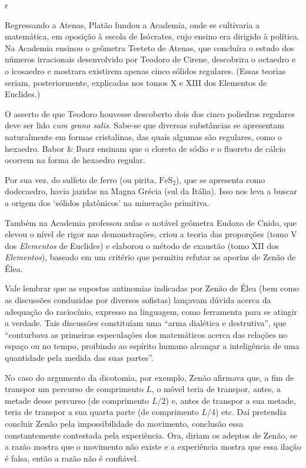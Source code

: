 r\documentclass{hipatia}
\begin{document}
Regressando a Atenas, Platão fundou a Academia, onde se cultivaria a matemática, em oposição à escola de Isócrates, cujo ensino era dirigido à política. Na Academia ensinou o geômetra Teeteto de Atenas, que concluíra o estudo dos números irracionais desenvolvido por Teodoro de Cirene, descobrira o octaedro e o icosaedro e mostrara existirem apenas cinco sólidos regulares. (Essas teorias seriam, posteriormente, explicadas nos tomos X e XIII dos Elementos de Euclides.)  \cite[ p. 64]{aaboe1984}\cite[p. 172, 188]{mosterin1984}\cite[p. 147]{russell1945}

O asserto de que Teodoro houvesse descoberto dois dos cinco poliedros regulares deve ser lido \emph{cum grano salis}. Sabe-se que diversas substâncias se apresentam naturalmente em formas cristalinas, das quais algumas são regulares, como o hexaedro. Babor \& Ibarz ensinam que o cloreto de sódio e o fluoreto de cálcio ocorrem na forma de hexaedro regular. \cite[p. 84]{babor1960}

Por sua vez, do sulfeto de ferro (ou pirita, $\mathrm{FeS}_2$), que se apresenta como dodecaedro, havia jazidas na Magna Grécia (sul da Itália).  \cite[p. 41--42]{struik1987}
Isso nos leva a buscar a origem dos ‘sólidos platônicos’ na mineração primitiva. 

Também na Academia professou aulas o notável geômetra Eudoxo de Cnido, que elevou o nível de rigor nas demonstrações, criou a teoria das proporções (tomo V dos \emph{Elementos} de Euclides) e elaborou o método de exaustão (tomo XII dos \emph{Elementos}), baseado em um critério que permitiu refutar as aporias de Zenão de Élea.   \cite[p. 64]{aaboe1984}\cite[p. 175]{mosterin1984}

Vale lembrar que as supostas antinomias indicadas por Zenão de Élea  (bem como as discussões conduzidas por diversos sofistas)  lançavam dúvida acerca da adequação do raciocínio, expresso na linguagem, como ferramenta para se atingir a verdade. Tais discussões constituíam uma ``arma dialética e destrutiva'', que ``conturbava as primeiras especulações dos matemáticos acerca das relações no espaço ou no tempo, proibindo ao espírito humano alcançar a inteligência de uma quantidade pela medida das suas partes''. \cite[p. 154]{brunschvicg1972} 

No caso do argumento da dicotomia, por exemplo, Zenão afirmava que, a fim de transpor um percurso de comprimento $L$, o móvel teria de transpor, antes, a metade desse percurso (de comprimento $L/2$) e, antes de transpor a sua metade, teria de transpor a sua quarta parte (de comprimento $L/4$) etc. Daí pretendia concluir Zenão pela impossibilidade do movimento, conclusão essa constantemente contestada pela experiência. Ora, diriam os adeptos de Zenão, se a razão mostra que o movimento não existe e a experiência mostra que essa ilação é falsa, então a razão não é confiável.
\end{document}
